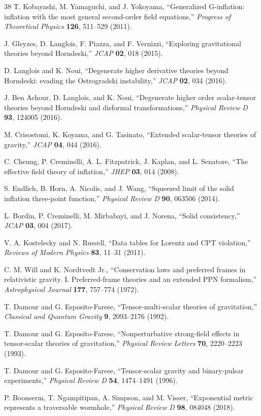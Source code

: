 \documentclass[12pt]{article}
\begin{document}
\begin{thebibliography}{38}
T. Kobayashi, M. Yamaguchi, and J. Yokoyama, ``Generalized G-inflation: inflation with the most general second-order field equations,'' \textit{Progress of Theoretical Physics} \textbf{126}, 511--529 (2011).

J. Gleyzes, D. Langlois, F. Piazza, and F. Vernizzi, ``Exploring gravitational theories beyond Horndeski,'' \textit{JCAP} \textbf{02}, 018 (2015).

D. Langlois and K. Noui, ``Degenerate higher derivative theories beyond Horndeski: evading the Ostrogradski instability,'' \textit{JCAP} \textbf{02}, 034 (2016).

J. Ben Achour, D. Langlois, and K. Noui, ``Degenerate higher order scalar-tensor theories beyond Horndeski and disformal transformations,'' \textit{Physical Review D} \textbf{93}, 124005 (2016).

M. Crisostomi, K. Koyama, and G. Tasinato, ``Extended scalar-tensor theories of gravity,'' \textit{JCAP} \textbf{04}, 044 (2016).

C. Cheung, P. Creminelli, A. L. Fitzpatrick, J. Kaplan, and L. Senatore, ``The effective field theory of inflation,'' \textit{JHEP} \textbf{03}, 014 (2008).

S. Endlich, B. Horn, A. Nicolis, and J. Wang, ``Squeezed limit of the solid inflation three-point function,'' \textit{Physical Review D} \textbf{90}, 063506 (2014).

L. Bordin, P. Creminelli, M. Mirbabayi, and J. Norena, ``Solid consistency,'' \textit{JCAP} \textbf{03}, 004 (2017).

V. A. Kostelecky and N. Russell, ``Data tables for Lorentz and CPT violation,'' \textit{Reviews of Modern Physics} \textbf{83}, 11--31 (2011).

C. M. Will and K. Nordtvedt Jr., ``Conservation laws and preferred frames in relativistic gravity. I. Preferred-frame theories and an extended PPN formalism,'' \textit{Astrophysical Journal} \textbf{177}, 757--774 (1972).

T. Damour and G. Esposito-Farese, ``Tensor-multi-scalar theories of gravitation,'' \textit{Classical and Quantum Gravity} \textbf{9}, 2093--2176 (1992).

T. Damour and G. Esposito-Farese, ``Nonperturbative strong-field effects in tensor-scalar theories of gravitation,'' \textit{Physical Review Letters} \textbf{70}, 2220--2223 (1993).

T. Damour and G. Esposito-Farese, ``Tensor-scalar gravity and binary-pulsar experiments,'' \textit{Physical Review D} \textbf{54}, 1474--1491 (1996).

P. Boonserm, T. Ngampitipan, A. Simpson, and M. Visser, ``Exponential metric represents a traversable wormhole,'' \textit{Physical Review D} \textbf{98}, 084048 (2018).

\end{thebibliography}
\end{document}
